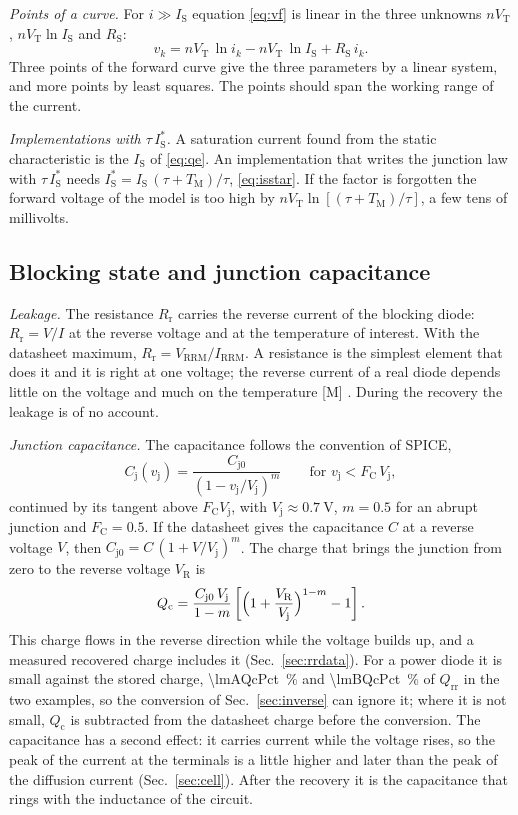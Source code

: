 \documentclass[10pt,a4paper]{scrartcl}
\newcommand{\VR}{V_\mathrm{R}}
\newcommand{\Qrr}{Q_\mathrm{rr}}
\newcommand{\TM}{T_\mathrm{M}}
\newcommand{\vj}{v_\mathrm{j}}
\newcommand{\IS}{I_\mathrm{S}}
\newcommand{\RS}{R_\mathrm{S}}
\newcommand{\Rr}{R_\mathrm{r}}
\newcommand{\VT}{V_\mathrm{T}}
\newcommand{\Cj}{C_\mathrm{j}}
\newcommand{\Cjo}{C_\mathrm{j0}}
\newcommand{\Vrrm}{V_\mathrm{RRM}}
\newcommand{\Irrm}{I_\mathrm{RRM}}
\begin{document}
\emph{Points of a curve.} For $i \gg \IS$ equation \eqref{eq:vf} is linear in the three unknowns $n\VT$, $n\VT\ln\IS$ and $\RS$:
\begin{equation}
v_k = n\VT\,\ln i_k - n\VT\,\ln\IS + \RS\, i_k .
\label{eq:points}
\end{equation}
Three points of the forward curve give the three parameters by a linear system, and more points by least squares. The points should span the working range of the current.

\emph{Implementations with $\tau\,\IS^{*}$.} A saturation current found from the static characteristic is the $\IS$ of \eqref{eq:qe}. An implementation that writes the junction law with $\tau\,\IS^{*}$ needs $\IS^{*} = \IS\,(\tau+\TM)/\tau$, \eqref{eq:isstar}. If the factor is forgotten the forward voltage of the model is too high by $n\VT\ln[(\tau+\TM)/\tau]$, a few tens of millivolts.

\subsection{Blocking state and junction capacitance}
\label{sec:blocking}
\emph{Leakage.} The resistance $\Rr$ carries the reverse current of the blocking diode: $\Rr = V/I$ at the reverse voltage and at the temperature of interest. With the datasheet maximum, $\Rr = \Vrrm/\Irrm$. A resistance is the simplest element that does it and it is right at one voltage; the reverse current of a real diode depends little on the voltage and much on the temperature [M] \cite{lutz}. During the recovery the leakage is of no account.

\emph{Junction capacitance.} The capacitance follows the convention of SPICE,
\begin{equation}
\Cj(\vj) = \frac{\Cjo}{(1 - \vj/V_\mathrm{j})^{m}} \qquad \text{for } \vj < F_\mathrm{C}\,V_\mathrm{j} ,
\label{eq:cj}
\end{equation}
continued by its tangent above $F_\mathrm{C} V_\mathrm{j}$, with $V_\mathrm{j} \approx \SI{0.7}{\volt}$, $m = 0.5$ for an abrupt junction and $F_\mathrm{C} = 0.5$. If the datasheet gives the capacitance $C$ at a reverse voltage $V$, then $\Cjo = C\,(1+V/V_\mathrm{j})^{m}$. The charge that brings the junction from zero to the reverse voltage $\VR$ is
\begin{equation}
Q_\mathrm{c} = \frac{\Cjo\,V_\mathrm{j}}{1-m}\left[\Bigl(1+\frac{\VR}{V_\mathrm{j}}\Bigr)^{1-m} - 1\right] .
\label{eq:qc}
\end{equation}
This charge flows in the reverse direction while the voltage builds up, and a measured recovered charge includes it (Sec.~\ref{sec:rrdata}). For a power diode it is small against the stored charge, \SI{\lmAQcPct}{\percent} and \SI{\lmBQcPct}{\percent} of $\Qrr$ in the two examples, so the conversion of Sec.~\ref{sec:inverse} can ignore it; where it is not small, $Q_\mathrm{c}$ is subtracted from the datasheet charge before the conversion. The capacitance has a second effect: it carries current while the voltage rises, so the peak of the current at the terminals is a little higher and later than the peak of the diffusion current (Sec.~\ref{sec:cell}). After the recovery it is the capacitance that rings with the inductance of the circuit.
\end{document}
